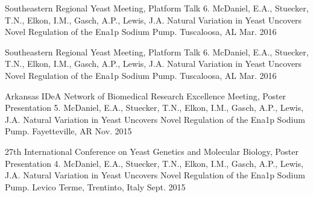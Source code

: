 

\begin{cventries}

  \cventry
    {Southeastern Regional Yeast Meeting, Platform Talk} %
    {6. McDaniel, E.A., Stuecker, T.N., Elkon, I.M., Gasch, A.P., Lewis, J.A. Natural Variation
in Yeast Uncovers Novel Regulation of the Ena1p Sodium Pump.} %
    {Tuscaloosa, AL} %
    {Mar. 2016} %
    {
      \begin{cvitems} %
      \end{cvitems}
    }
  \cventry
    {Southeastern Regional Yeast Meeting, Platform Talk} %
    {6. McDaniel, E.A., Stuecker, T.N., Elkon, I.M., Gasch, A.P., Lewis, J.A. Natural Variation
in Yeast Uncovers Novel Regulation of the Ena1p Sodium Pump.} %
    {Tuscaloosa, AL} %
    {Mar. 2016} %
    {
      \begin{cvitems} %
      \end{cvitems}
    }
  \cventry
    {Arkansas IDeA Network of Biomedical Research Excellence Meeting, Poster Presentation} %
    {5. McDaniel, E.A., Stuecker, T.N., Elkon, I.M., Gasch, A.P., Lewis, J.A. Natural Variation
in Yeast Uncovers Novel Regulation of the Ena1p Sodium Pump.} %
    {Fayetteville, AR} %
    {Nov. 2015} %
    {
      \begin{cvitems} %
      \end{cvitems}
    }
  \cventry
    {27th International Conference on Yeast Genetics and Molecular Biology, Poster Presentation} %
    {4. McDaniel, E.A., Stuecker, T.N., Elkon, I.M., Gasch, A.P., Lewis, J.A. Natural Variation
in Yeast Uncovers Novel Regulation of the Ena1p Sodium Pump.} %
    {Levico Terme, Trentinto, Italy} %
    {Sept. 2015} %
    {
      \begin{cvitems} %
      \end{cvitems}
}
\end{cventries}
